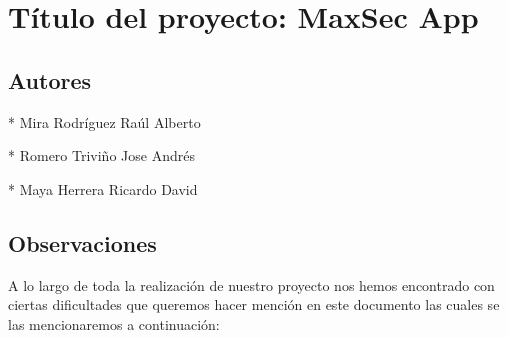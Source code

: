 \documentclass[12pt,letterpaper]{article}
\begin{document}
\section{Título del proyecto: MaxSec App}
\subsection{Autores}

* Mira Rodríguez Raúl Alberto

* Romero Triviño Jose Andrés

* Maya Herrera Ricardo David

\subsection{Observaciones}
  A lo largo de toda la realización de nuestro proyecto nos hemos encontrado con ciertas dificultades que queremos hacer mención en este documento las cuales se las mencionaremos a continuación:
\end{document}
